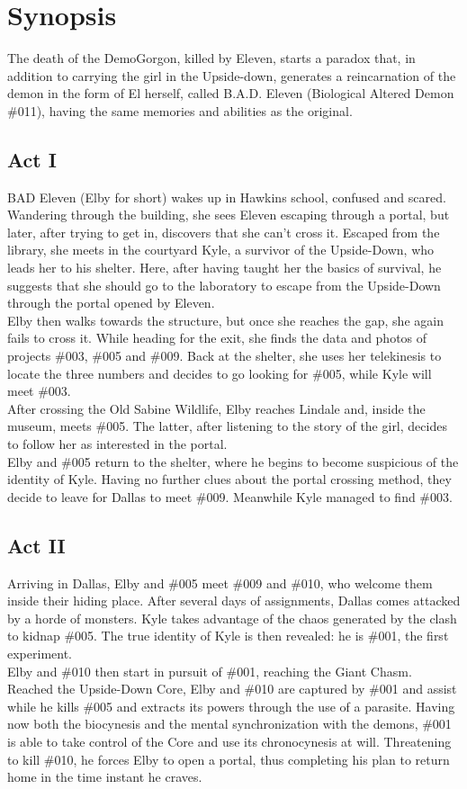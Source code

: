 \section{Synopsis}

The death of the DemoGorgon, killed by Eleven, starts a paradox that, in addition to carrying the girl in the Upside-down, generates a reincarnation of the demon in the form of El herself, called B.A.D. Eleven (Biological Altered Demon \#011), having the same memories and abilities as the original.

\subsection{Act I}
BAD Eleven (Elby for short) wakes up in Hawkins school, confused and scared. Wandering through the building, she sees Eleven escaping through a portal, but later, after trying to get in, discovers that she can't cross it. Escaped from the library, she meets in the courtyard Kyle, a survivor of the Upside-Down, who leads her to his shelter. Here, after having taught her the basics of survival, he suggests that she should go to the laboratory to escape from the Upside-Down through the portal opened by Eleven.\\
Elby then walks towards the structure, but once she reaches the gap, she again fails to cross it. While heading for the exit, she finds the data and photos of projects \#003, \#005 and \#009. Back at the shelter, she uses her telekinesis to locate the three numbers and decides to go looking for \#005, while Kyle will meet \#003.\\
After crossing the Old Sabine Wildlife, Elby reaches Lindale and, inside the museum, meets \#005. The latter, after listening to the story of the girl, decides to follow her as interested in the portal.\\
Elby and \#005 return to the shelter, where he begins to become suspicious of the identity of Kyle. Having no further clues about the portal crossing method, they decide to leave for Dallas to meet \#009. Meanwhile Kyle managed to find \#003.

\subsection{Act II}
Arriving in Dallas, Elby and \#005 meet \#009 and \#010, who welcome them inside their hiding place. After several days of assignments, Dallas comes attacked by a horde of monsters. Kyle takes advantage of the chaos generated by the clash to kidnap \#005. The true identity of Kyle is then revealed: he is \#001, the first experiment.\\
Elby and \#010 then start in pursuit of \#001, reaching the Giant Chasm.\\
Reached the Upside-Down Core, Elby and \#010 are captured by \#001 and assist while he kills \#005 and extracts its powers through the use of a parasite.
Having now both the biocynesis and the mental synchronization with the demons, \#001 is able to take control of the Core and use its chronocynesis at will.
Threatening to kill \#010, he forces Elby to open a portal, thus completing his plan to return home in the time instant he craves.

